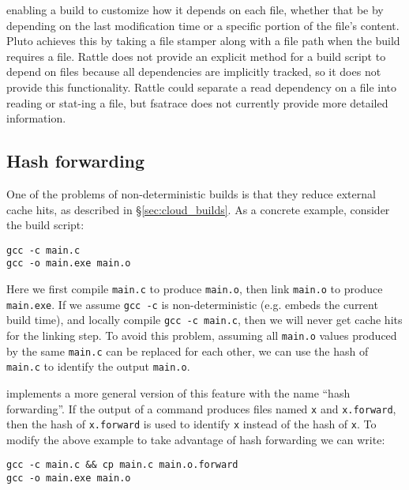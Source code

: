 \begin{itemize}
  enabling a build to customize how it depends on each file, whether that be by depending on the
  last modification time or a specific portion of the file's content.  Pluto achieves this by
  taking a file stamper along with a file path when the build requires a file.  Rattle does not
  provide an explicit method for a build script to depend on files because all dependencies are
  implicitly tracked, so it does not provide this functionality.  Rattle could separate a read dependency on a file into reading or stat-ing a file, but fsatrace does not currently provide more
  detailed information.

\end{itemize}


\subsection{Hash forwarding}
\label{sec:forward_hashes}

One of the problems of non-deterministic builds is that they reduce external cache hits, as described in \S\ref{sec:cloud_builds}. As a concrete example, consider the build script:

\begin{small}
\begin{verbatim}
gcc -c main.c
gcc -o main.exe main.o
\end{verbatim}
\end{small}

Here we first compile \texttt{main.c} to produce \texttt{main.o}, then link \texttt{main.o} to produce \texttt{main.exe}. If we assume \texttt{gcc -c} is non-deterministic (e.g. embeds the current build time), and locally compile \texttt{gcc -c main.c}, then we will never get cache hits for the linking step. To avoid this problem, assuming all \texttt{main.o} values produced by the same \texttt{main.c} can be replaced for each other, we can use the hash of \texttt{main.c} to identify the output \texttt{main.o}.

\Rattle implements a more general version of this feature with the name ``hash forwarding''. If the output of a command produces files named \texttt{x} and \texttt{x.forward}, then the hash of \texttt{x.forward} is used to identify \texttt{x} instead of the hash of \texttt{x}. To modify the above example to take advantage of hash forwarding we can write:

\begin{verbatim}
gcc -c main.c && cp main.c main.o.forward
gcc -o main.exe main.o
\end{verbatim}

